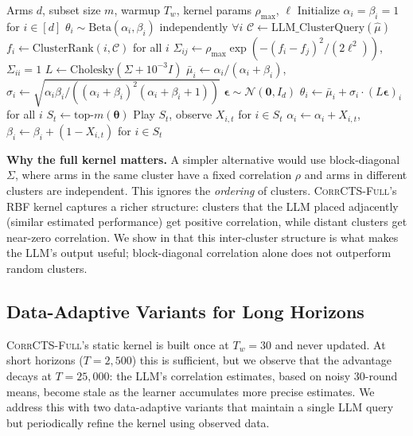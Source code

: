 \documentclass{article}
\theoremstyle{plain}
\theoremstyle{definition}
\theoremstyle{remark}
\newcommand{\CorrFull}{\textsc{CorrCTS-Full}}
\begin{document}
\begin{algorithm}[t]
\caption{\CorrFull{}: Correlated Thompson Sampling with Full Kernel Covariance}
\label{alg:corrfull}
\begin{algorithmic}[1]
\REQUIRE Arms $d$, subset size $m$, warmup $T_w$, kernel params $\rho_{\max}$, $\ell$
\STATE Initialize $\alpha_i = \beta_i = 1$ for $i \in [d]$
    \STATE $\theta_i \sim \text{Beta}(\alpha_i, \beta_i)$ independently $\forall i$
    \STATE $\mathcal{C} \gets \text{LLM\_ClusterQuery}(\hat\mu)$
    \STATE $f_i \gets \text{ClusterRank}(i, \mathcal{C})$ for all $i$
    \STATE $\Sigma_{ij} \gets \rho_{\max}\exp(-(f_i - f_j)^2/(2\ell^2))$, $\Sigma_{ii} = 1$
    \STATE $L \gets \text{Cholesky}(\Sigma + 10^{-3}I)$
  \ENDIF
    \STATE $\bar\mu_i \gets \alpha_i / (\alpha_i + \beta_i)$, $\sigma_i \gets \sqrt{\alpha_i\beta_i/((\alpha_i+\beta_i)^2(\alpha_i+\beta_i+1))}$
    \STATE $\boldsymbol{\epsilon} \sim \mathcal{N}(\mathbf{0}, I_d)$
    \STATE $\theta_i \gets \bar\mu_i + \sigma_i \cdot (L\boldsymbol{\epsilon})_i$ for all $i$
  \ENDIF
  \STATE $S_t \gets \text{top-}m(\boldsymbol{\theta})$
  \STATE Play $S_t$, observe $X_{i,t}$ for $i \in S_t$
  \STATE $\alpha_i \gets \alpha_i + X_{i,t}$, $\beta_i \gets \beta_i + (1 - X_{i,t})$ for $i \in S_t$
\ENDFOR
\end{algorithmic}
\end{algorithm}

\textbf{Why the full kernel matters.}
A simpler alternative would use block-diagonal $\Sigma$, where arms in the same cluster have a fixed correlation $\rho$ and arms in different clusters are independent.
This ignores the \emph{ordering} of clusters.
\CorrFull{}'s RBF kernel captures a richer structure: clusters that the LLM placed adjacently (similar estimated performance) get positive correlation, while distant clusters get near-zero correlation.
We show in  that this inter-cluster structure is what makes the LLM's output useful; block-diagonal correlation alone does not outperform random clusters.

\subsection{Data-Adaptive Variants for Long Horizons}\label{sec:adaptive}

\CorrFull{}'s static kernel is built once at $T_w = 30$ and never updated.
At short horizons ($T = 2{,}500$) this is sufficient, but we observe that the advantage decays at $T = 25{,}000$: the LLM's correlation estimates, based on noisy 30-round means, become stale as the learner accumulates more precise estimates.
We address this with two data-adaptive variants that maintain a single LLM query but periodically refine the kernel using observed data.
\end{document}

